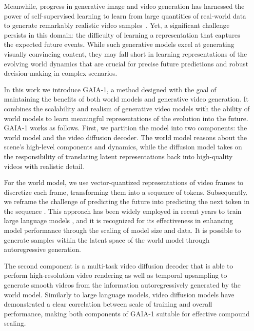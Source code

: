 Meanwhile, progress in generative image and video generation has harnessed the power of self-supervised learning to learn from large quantities of real-world data to generate remarkably realistic video samples~\citep{ho2022imagen,harvey2022flexible,esser2023structure}. Yet, a significant challenge persists in this domain: the difficulty of learning a representation that captures the expected future events. While such generative models excel at generating visually convincing content, they may fall short in learning representations of the evolving world dynamics that are crucial for precise future predictions and robust decision-making in complex scenarios. 

In this work we introduce GAIA-1, a method designed with the goal of maintaining the benefits of both world models and generative video generation. It combines the scalability and realism of generative video models with the ability of world models to learn meaningful representations of the evolution into the future. GAIA-1 works as follows. First, we partition the model into two components: the world model and the video diffusion decoder. The world model reasons about the scene's high-level components and dynamics, while the diffusion model takes on the responsibility of translating latent representations back into high-quality videos with realistic detail.

For the world model, we use vector-quantized representations of video frames to discretize each frame, transforming them into a sequence of tokens. Subsequently, we reframe the challenge of predicting the future into predicting the next token in the sequence \citep{janner2021sequence,chen2021decisiontransformer}. This approach has been widely employed in recent years to train large language models \citep{megatron22,Chowdhery2022PaLMSL,llama23,openai2023gpt4}, and it is recognized for its effectiveness in enhancing model performance through the scaling of model size and data. It is possible to generate samples within the latent space of the world model through autoregressive generation.

The second component is a multi-task video diffusion decoder that is able to perform high-resolution video rendering as well as temporal upsampling to generate smooth videos from the information autoregressively generated by the world model. Similarly to large language models, video diffusion models have demonstrated a clear correlation between scale of training and overall performance, making both components of GAIA-1 suitable for effective compound scaling.

